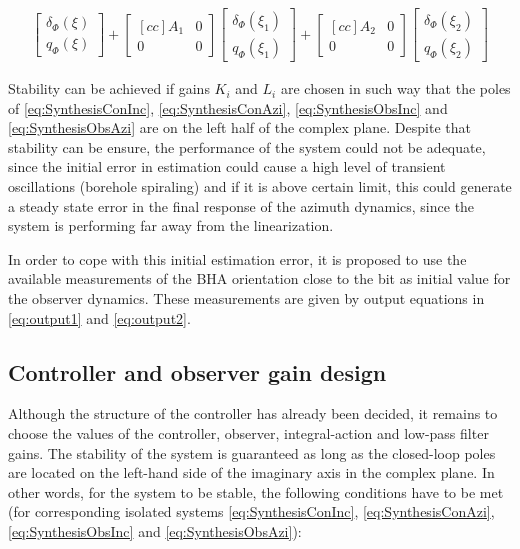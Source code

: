 \documentclass[main.tex]{subfiles}
\begin{document}
\begin{align}
    	\begin{bmatrix}
    	\delta_\Phi (\xi)\\
    	q_\Phi (\xi)
    	\end{bmatrix} + 
    	\begin{bmatrix}[cc]
    	A_1 & 0\\ 
    	0 & 0
    	\end{bmatrix}
    	\begin{bmatrix}
    	\delta_\Phi (\xi_1)\\
    	q_\Phi (\xi_1)
    	\end{bmatrix} + 
    	\begin{bmatrix}[cc]
    	A_2 & 0\\ 
    	0 & 0
    	\end{bmatrix}
    	\begin{bmatrix}
    	\delta_\Phi (\xi_2)\\
    	q_\Phi (\xi_2)
    	\end{bmatrix} \label{eq:SynthesisObsAzi}
\end{align}

Stability can be achieved if gains $K_i$ and $L_i$ are chosen in such way that the poles of \eqref{eq:SynthesisConInc}, \eqref{eq:SynthesisConAzi}, \eqref{eq:SynthesisObsInc} and \eqref{eq:SynthesisObsAzi} are on the left half of the complex plane. Despite that stability can be ensure, the performance of the system could not be adequate, since the initial error in estimation could cause a high level of transient oscillations (borehole spiraling) and if it is above certain limit, this could generate a steady state error in the final response of the azimuth dynamics, since the system is performing far away from the linearization.

In order to cope with this initial estimation error, it is proposed to use the available measurements of the BHA orientation close to the bit as initial value for the observer dynamics. These measurements are given by output equations in \eqref{eq:output1} and \eqref{eq:output2}.

\subsection{Controller and observer gain design}

Although the structure of the controller has already been decided, it remains to choose the values of the controller, observer, integral-action and low-pass filter gains. The stability of the system is guaranteed as long as the closed-loop poles are located on the left-hand side of the imaginary axis in the complex plane. In other words, for the system to be stable, the following conditions have to be met (for corresponding isolated systems \eqref{eq:SynthesisConInc}, \eqref{eq:SynthesisConAzi}, \eqref{eq:SynthesisObsInc} and \eqref{eq:SynthesisObsAzi}):
\end{document}
